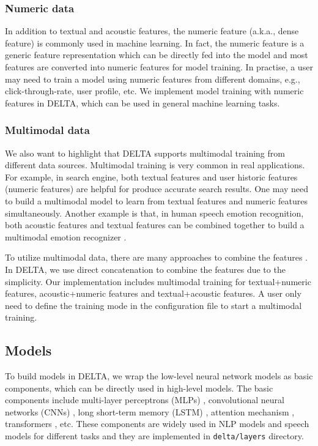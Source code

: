 \documentclass{article}
\begin{document}
\subsubsection{Numeric data}
In addition to textual and acoustic features, the numeric feature (a.k.a., dense feature) is commonly used in machine learning. In fact, the numeric feature is a generic feature representation which can be directly fed into the model and most features are converted into numeric features for model training. In practise, a user may need to train a model using numeric features from different domains, e.g., click-through-rate, user profile, etc. We implement model training with numeric features in DELTA, which can be used in general machine learning tasks.




\subsubsection{Multimodal data}

We also want to highlight that DELTA supports multimodal training from different data sources. Multimodal training is very common in real applications. For example, in search engine, both textual features and user historic features (numeric features) are helpful for produce accurate search results. One may need to build a multimodal model to learn from textual features and numeric features simultaneously. Another example is that, in human speech emotion recognition, both acoustic features and textual features can be combined together to build a multimodal emotion recognizer \citep{xu2019alignment}.

To utilize multimodal data, there are many approaches to combine the features \citep{ngiam2011multimodal}. In DELTA, we use direct concatenation to combine the features due to the simplicity. Our implementation includes multimodal training for textual+numeric features, acoustic+numeric features and textual+acoustic features. A user only need to define the training mode in the configuration file to start a multimodal training.

\subsection{Models}


To build models in DELTA, we wrap the low-level neural network models as basic components, which can be directly used in high-level models. The basic components include multi-layer perceptrons (MLPs) \citep{rosenblatt1958perceptron,rumelhart1988learning}, convolutional neural networks (CNNs) \citep{lecun1990handwritten}, long short-term memory (LSTM) \citep{hochreiter1997long}, attention mechanism \citep{bahdanau2014neural}, transformers \citep{vaswani2017attention}, etc. These components are widely used in NLP models and speech models for different tasks and they are implemented in \texttt{delta/layers} directory.
\end{document}
